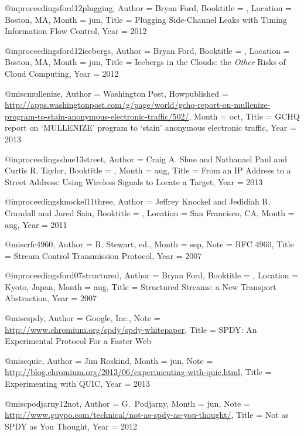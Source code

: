 {{@inproceedings{ford12plugging,
	Author = {Bryan Ford},
	Booktitle = {},
	Location = {Boston, MA},
	Month = jun,
	Title = {Plugging Side-Channel Leaks with Timing Information Flow Control},
	Year = 2012}

@inproceedings{ford12icebergs,
	Author = {Bryan Ford},
	Booktitle = {},
	Location = {Boston, MA},
	Month = jun,
	Title = {Icebergs in the Clouds: the {\em Other} Risks of Cloud Computing},
	Year = 2012}

@misc{mullenize,
	Author = {Washington Post},
	Howpublished = {\url{http://apps.washingtonpost.com/g/page/world/gchq-report-on-mullenize-program-to-stain-anonymous-electronic-traffic/502/}},
	Month = {oct},
	Title = {{GCHQ} report on {`MULLENIZE'} program to `stain' anonymous electronic traffic},
	Year = {2013}}

@inproceedings{shue13street,
	Author = {Craig A. Shue and Nathanael Paul and Curtis R. Taylor},
	Booktitle = {},
	Month = aug,
	Title = {From an {IP} Address to a Street Address: Using Wireless Signals to Locate a Target},
	Year = 2013}

@inproceedings{knockel11three,
	Author = {Jeffrey Knockel and Jedidiah R. Crandall and Jared Saia},
	Booktitle = {},
	Location = {San Francisco, CA},
	Month = aug,
	Year = 2011}

@misc{rfc4960,
	Author = {R. {Stewart, ed.}},
	Month = sep,
	Note = {RFC 4960},
	Title = {Stream Control Transmission Protocol},
	Year = 2007}

@inproceedings{ford07structured,
	Author = {Bryan Ford},
	Booktitle = {},
	Location = {Kyoto, Japan},
	Month = aug,
	Title = {Structured Streams: a New Transport Abstraction},
	Year = {2007}}

@misc{spdy,
	Author = {Google, Inc.},
	Note = {\url{http://www.chromium.org/spdy/spdy-whitepaper}},
	Title = {{SPDY}: An Experimental Protocol For a Faster {Web}}}

@misc{quic,
	Author = {Jim Roskind},
	Month = jun,
	Note = {\url{http://blog.chromium.org/2013/06/experimenting-with-quic.html}},
	Title = {Experimenting with {QUIC}},
	Year = 2013}

@misc{podjarny12not,
	Author = {G.~Podjarny},
	Month = jun,
	Note = {\url{http://www.guypo.com/technical/not-as-spdy-as-you-thought/}},
	Title = {{Not as SPDY as You Thought}},
	Year = 2012}

}}
